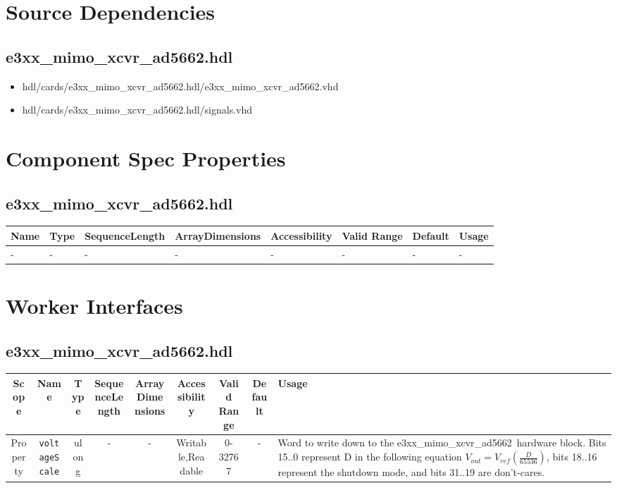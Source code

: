 \documentclass{article}
\def\comp{e3xx\_mimo\_xcvr\_ad5662}
\begin{document}
\section*{Source Dependencies}
\subsection*{\comp.hdl}
\begin{itemize}
	\item hdl/cards/\comp.hdl/\comp.vhd
	\item hdl/cards/\comp.hdl/signals.vhd
\end{itemize}

\begin{landscape}
\section*{Component Spec Properties}
	\subsection*{\comp.hdl}
    \begin{scriptsize}
    	\begin{tabular}{|p{3.75cm}|p{1.25cm}|p{2cm}|p{2.75cm}|p{1.5cm}|p{1.5cm}|p{1cm}|p{6.23cm}|}
        \hline
        \rowcolor{blue}
        Name & Type & SequenceLength & ArrayDimensions & Accessibility & Valid Range & Default & Usage \\
        \hline
        - & - & - & - & - & - & - & - \\
        \hline
        \end{tabular}
    \end{scriptsize}

\section*{Worker Interfaces}
	\subsection*{\comp.hdl}
	\begin{scriptsize}
		\begin{tabular}{|c|c|c|c|c|c|c|c|p{8.5cm}|}
			\hline
			\rowcolor{blue}
			Scope        & Name                 & Type  & SequenceLength & ArrayDimensions & Accessibility     & Valid Range & Default & Usage \\
			\hline
			Property     & \verb+voltageScale+  & ulong & -              & -               & Writable,Readable & 0-32767     & -       & Word to write down to the \comp\ hardware block. Bits 15..0 represent D in the following equation \(V_{out}=V_{ref} (\frac{D}{65536})\), bits 18..16 represent the shutdown mode, and bits 31..19 are don't-cares.    \\
			\hline
		\end{tabular}
	\end{scriptsize}


\end{landscape}
\end{document}
